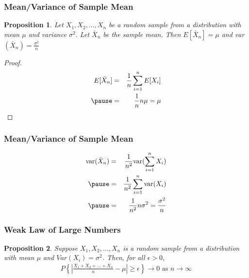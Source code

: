 \documentclass{beamer}
\newtheorem{prop}{Proposition}
\numberwithin{equation}{section}
\begin{document}
\begin{frame}
\frametitle{Mean/Variance of Sample Mean}

\begin{prop}
Let $X_{1}, X_{2}, \hdots, X_{n}$ be a random sample from a distribution with mean $\mu$ and variance $\sigma^2$.  Let $\bar{X}_{n}$ be the sample mean.  Then 
$E[\bar{X}_{n}] = \mu$ and var$(\bar{X}_{n}) = \frac{\sigma^2}{n}$
\end{prop}

\pause 
\begin{proof}

\begin{eqnarray}
E[\bar{X}_{n}] & = & \frac{1}{n}\sum_{i=1}^{n} E[X_{i}] \nonumber \\ \pause 
& = & \frac{1}{n} n \mu  = \mu \nonumber 
\end{eqnarray}



\end{proof}


\end{frame}


\begin{frame}
\frametitle{Mean/Variance of Sample Mean}


\pause 
\begin{eqnarray}
\text{var}(\bar{X}_{n}) & = & \frac{1}{n^2} \text{var}(\sum_{i=1}^{n} X_{i}) \nonumber \\ \pause 
 &= & \frac{1}{n^2} \sum_{i=1}^{n} \text{var}(X_{i}) \nonumber \\ \pause 
 & = & \frac{1}{n^2} n \sigma^2 = \frac{\sigma^2}{n} \nonumber  
\end{eqnarray}


\end{frame}



\begin{frame}
\frametitle{Weak Law of Large Numbers} 

\begin{prop}
Suppose $X_{1}, X_{2}, \hdots, X_{n}$ is a random sample from a distribution with mean $\mu$ and $Var(X_{i})= \sigma^2$.  Then, for all $\epsilon >0$, 
\begin{eqnarray}
P\left\{ \left| \frac{X_{1} + X_{2} + \hdots + X_{n} }{n} -\mu \right| \geq \epsilon \right\} \rightarrow 0 \text{ as } n \rightarrow \infty \nonumber 
\end{eqnarray}

\end{prop}


\end{frame}
\end{document}
